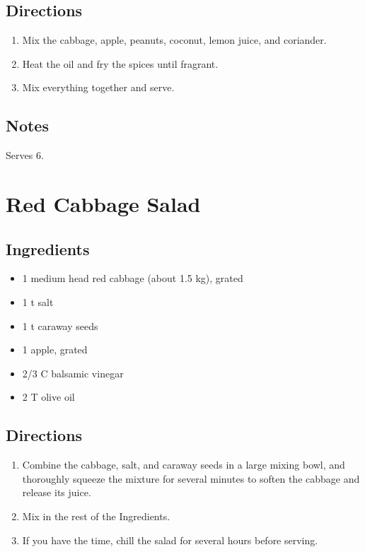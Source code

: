 \documentclass[letterpaper,10pt,english]{sphinxmanual}
\begin{document}
\section{Directions}
\label{cabbage_salad:directions}\begin{enumerate}
\item {} 
Mix the cabbage, apple, peanuts, coconut, lemon juice, and coriander.

\item {} 
Heat the oil and fry the spices until fragrant.

\item {} 
Mix everything together and serve.

\end{enumerate}


\section{Notes}
\label{cabbage_salad:notes}
Serves 6.


\chapter{Red Cabbage Salad}
\label{red_cabbage_salad::doc}\label{red_cabbage_salad:red-cabbage-salad}

\section{Ingredients}
\label{red_cabbage_salad:ingredients}\begin{itemize}
\item {} 
1       medium head red cabbage (about 1.5 kg), grated

\item {} 
1   t   salt

\item {} 
1   t   caraway seeds

\item {} 
1       apple, grated

\item {} 
2/3 C   balsamic vinegar

\item {} 
2   T   olive oil

\end{itemize}


\section{Directions}
\label{red_cabbage_salad:directions}\begin{enumerate}
\item {} 
Combine the cabbage, salt, and caraway seeds in a large mixing bowl, and thoroughly squeeze the mixture for several minutes to soften the cabbage and release its juice.

\item {} 
Mix in the rest of the Ingredients.

\item {} 
If you have the time, chill the salad for several hours before serving.

\end{enumerate}
\end{document}
